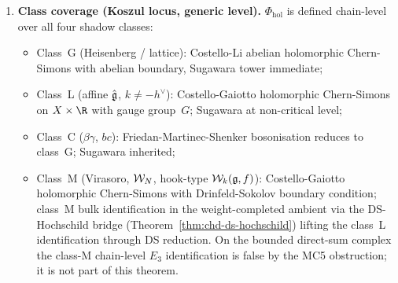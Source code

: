 \begin{theorem}
\begin{enumerate}[label=\textup{(\roman*)}]
\[\begin{array}{c}
 \HTQFT_{X \times \R}(T_{\cW_k(\fg,f)})
 \end{array}
 \]
 commutes up to a natural isomorphism of functors, compatible with
 the DS-Hochschild bridge of Theorem~\ref*{thm:chd-ds-hochschild}.
\item \textbf{Class coverage (Koszul locus, generic level).}
 $\Phi_{\mathrm{hol}}$ is defined chain-level over all four
 shadow classes:
 \begin{itemize}[leftmargin=1.2em]
 \item Class~G (Heisenberg / lattice): Costello-Li abelian
 holomorphic Chern-Simons with abelian boundary, Sugawara tower
 immediate;
 \item Class~L (affine $\hat{\mathfrak{g}}$, $k \neq -h^\vee$):
 Costello-Gaiotto holomorphic Chern-Simons on $X \times \R$ with
 gauge group~$G$; Sugawara at non-critical level;
 \item Class~C ($\beta\gamma$, $bc$): Friedan-Martinec-Shenker
 bosonisation reduces to class~G; Sugawara inherited;
 \item Class~M (Virasoro, $\mathcal{W}_N$, hook-type $\mathcal{W}_k(\mathfrak{g}, f)$):
 Costello-Gaiotto holomorphic Chern-Simons with
 Drinfeld-Sokolov boundary condition; class~M bulk identification
 in the weight-completed ambient via the DS-Hochschild bridge
 (Theorem~\ref*{thm:chd-ds-hochschild}) lifting the
 class~L identification through DS reduction. On the bounded
 direct-sum complex the class-M chain-level $E_3$ identification is
 false by the MC5 obstruction; it is not part of this theorem.
 \end{itemize}
\end{enumerate}
\end{theorem}

